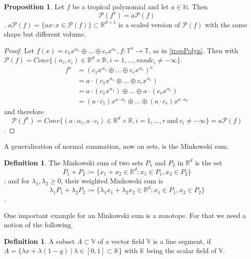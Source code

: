 \documentclass{article}
\theoremstyle{definition}
\newtheorem{definition}[theorem]{Definition}
\newtheorem{proposition}[theorem]{Proposition}
\begin{document}
\begin{proposition}\cite[p.~4]{zhang2018tropical}
Let $f$ be a tropical polynomial and let $a \in \mathbb{N}$. Then
$$ \mathcal{P}(f^{a}) = a \mathcal{P}(f) $$.
$a \mathcal{P}(f) = \{ax : x \in \mathcal{P}(f) \} \subset \mathbb{R}^{d + 1}$ is a scaled version of $\mathcal{P}(f)$ with the same shape but different volume.
\end{proposition}
\begin{proof}
Let $f(x)=c_{1}x^{\alpha_1} \oplus \dots \oplus c_{r}x^{\alpha_r}, f:\mathbb{T}^{n} \to \mathbb{T}$, as in \ref{tropPolyn}. Then with $\mathcal{P}(f) = Conv\{(\alpha_{i}, c_{i}) \in \mathbb{R}^{d} \times \mathbb{R}, i= 1, \dots , r and c_{i} \neq - \infty \}$.
\begin{align*}
f^{a} &= (c_{1}x^{\alpha_{1}} \oplus \dots \oplus c_{r} x^{\alpha_{r}})^{a} \\
&= a \cdot (c_{1}x^{\alpha_{1}} \oplus \dots \oplus c_{r} x^{\alpha_{r}}) \\
&= a \cdot (c_{1}x^{\alpha_{1}}) \oplus \dots \oplus a \cdot (c_{r} x^{\alpha_{r}}) \\
&= (a \cdot c_{1})x^{a \cdot \alpha_{1}} \oplus \dots \oplus (a \cdot c_{r}) x^{a \cdot \alpha_{r}}
\end{align*}
and therefore
$$\mathcal{P}(f^{a}) = Conv\{(a \cdot \alpha_{i}, a \cdot c_{i}) \in \mathbb{R}^{d} \times \mathbb{R}, i = 1, \dots, r \ \text{and} \ c_{i} \neq - \infty \} = a\mathcal{P}(f)$$.
\end{proof}

A generalisation of normal summation, now on sets, is the Minkowski sum.

\begin{definition}\cite[p.~4]{zhang2018tropical}
The Minkowski sum of two sets $P_1$ and $P_2$ in $\mathbb{R}^{d}$ is the set
$$ P_1 + P_2 := \{x_1 + x_2 \in \mathbb{R}^{d} : x_1 \in P_1 ,x_2 \in P_2 \} $$;
and for $\lambda_1 , \lambda_2 \geq 0$, their weighted Minkowski sum is
$$ \lambda_1 P_1 + \lambda_2 P_2 := \{ \lambda_1 x_1 + \lambda_2 x_2 \in \mathbb{R}^{d} : x_1 \in P_1 , x_2 \in P_2 \} $$.
\end{definition}

One important example for an Minkowski sum is a zonotope. For that we need a notion of the following.
\begin{definition}
A subset $A \subset \mathbb{V}$ of a vector field $\mathbb{V}$ is a line segment, if $A=\{\lambda x + \lambda (1-y) \ | \ \lambda \in [0,1]\subset \mathbb{K}\}$ with $\mathbb{K}$ being the scalar field of $\mathbb{V}$.
\end{definition}
\end{document}
